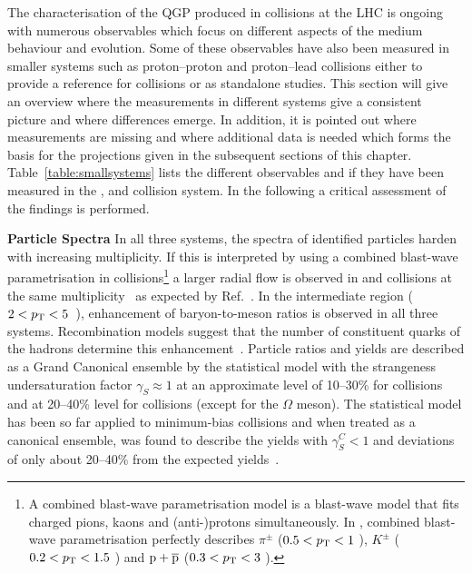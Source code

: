 \documentclass[../report.tex]{subfiles}
\begin{document}
The characterisation of the QGP produced in \PbPb collisions at the LHC is ongoing with numerous observables which focus on different aspects of the medium behaviour and evolution. Some of these observables have also been measured in smaller systems such as proton--proton and proton--lead collisions either to provide a reference for \PbPb collisions or as standalone studies. This section will give an overview where the measurements in different systems give a consistent picture and where differences emerge. In addition, it is pointed out where measurements are missing and where additional data is needed which forms the basis for the projections given in the subsequent sections of this chapter. Table~\ref{table:smallsystems} lists the different observables and if they have been measured in the \PbPb, \pPb and \pp collision system. In the following a critical assessment of the findings is performed.


\textbf{Particle Spectra}
In all three systems, the \pT spectra of identified particles harden with increasing multiplicity. If this is interpreted by using a combined blast-wave parametrisation in \PbPb collisions\footnote{A combined blast-wave parametrisation model is a blast-wave model that fits charged pions, kaons and (anti-)protons simultaneously. In \cite{Abelev:2012wca}, combined blast-wave parametrisation perfectly describes $\pi^{\pm}$ ($ 0.5 < p\sb{\scriptstyle\mathrm{T}} < 1$ \UGeVc), $K^{\pm}$ ($ 0.2 < p\sb{\scriptstyle\mathrm{T}} < 1.5$ \UGeVc) and ${\rm p}+\overline{\rm{p}}$ ($ 0.3 < p\sb{\scriptstyle\mathrm{T}} < 3$ \UGeVc).} a larger radial flow is observed in \pp and \pPb collisions at the same multiplicity~\cite{Acharya:2018orn} as expected by Ref.~\cite{Shuryak:2013ke}. In the intermediate \pT region ($2 < p\sb{\scriptstyle\mathrm{T}} < 5 $~\UGeVc), enhancement of baryon-to-meson ratios is observed in all three systems. Recombination models suggest that the number of constituent quarks of the hadrons determine this enhancement~\cite{Andrei:2014vaa,Abelev:2013xaa,Abelev:2013haa,Abelev:2014uua,Khachatryan:2016yru,Adam:2015jca,Adam:2016dau,Adam:2017zbf}. Particle ratios and yields are described as a Grand Canonical ensemble by the statistical model with the strangeness undersaturation factor $\gamma_{S}\approx 1$ at an approximate level of 10--30\% for \PbPb collisions and at 20--40\% level for \pPb collisions (except for the $\Omega$ meson). The statistical model has been so far applied to minimum-bias \pp collisions and when treated as a canonical ensemble, was found to describe the yields with $\gamma^{C}_{S} < 1$ and deviations of only about 20--40\% from the expected yields~\cite{Adam:2016emw,Adam:2016bpr,Adam:2015vsf,ABELEV:2013zaa}.
\end{document}
